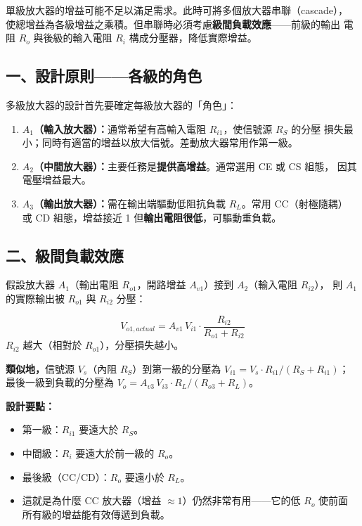\documentclass[12pt]{article}
\begin{document}

\begin{keybox}[為什麼需要多級放大器？]
單級放大器的增益可能不足以滿足需求。此時可將多個放大器串聯（cascade），
使總增益為各級增益之乘積。但串聯時必須考慮\textbf{級間負載效應}——前級的輸出
電阻 $R_o$ 與後級的輸入電阻 $R_i$ 構成分壓器，降低實際增益。
\end{keybox}

\subsection*{一、設計原則——各級的角色}

多級放大器的設計首先要確定每級放大器的「角色」：

\begin{enumerate}[leftmargin=2em,itemsep=3pt]
  \item \textbf{$A_1$（輸入放大器）：}通常希望有高輸入電阻 $R_{i1}$，使信號源 $R_S$ 的分壓
        損失最小；同時有適當的增益以放大信號。差動放大器常用作第一級。
  \item \textbf{$A_2$（中間放大器）：}主要任務是\textbf{提供高增益}。通常選用 CE 或 CS 組態，
        因其電壓增益最大。
  \item \textbf{$A_3$（輸出放大器）：}需在輸出端驅動低阻抗負載 $R_L$。常用 CC（射極隨耦）
        或 CD 組態，增益接近 1 但\textbf{輸出電阻很低}，可驅動重負載。
\end{enumerate}

\subsection*{二、級間負載效應}

\begin{keybox}
假設放大器 $A_1$（輸出電阻 $R_{o1}$，開路增益 $A_{v1}$）接到 $A_2$（輸入電阻 $R_{i2}$），
則 $A_1$ 的實際輸出被 $R_{o1}$ 與 $R_{i2}$ 分壓：
\begin{formulabox}
\[
  V_{o1,actual} = A_{v1}\,V_{i1} \cdot \frac{R_{i2}}{R_{o1} + R_{i2}}
\]
$R_{i2}$ 越大（相對於 $R_{o1}$），分壓損失越小。
\end{formulabox}

\textbf{類似地，}信號源 $V_s$（內阻 $R_S$）到第一級的分壓為
$V_{i1} = V_s \cdot R_{i1}/(R_S + R_{i1})$；
最後一級到負載的分壓為 $V_o = A_{v3}\,V_{i3} \cdot R_L/(R_{o3} + R_L)$。
\end{keybox}

\noindent\textbf{設計要點：}
\begin{itemize}[leftmargin=2em,itemsep=2pt]
  \item 第一級：$R_{i1}$ 要遠大於 $R_S$。
  \item 中間級：$R_i$ 要遠大於前一級的 $R_o$。
  \item 最後級（CC/CD）：$R_o$ 要遠小於 $R_L$。
  \item 這就是為什麼 CC 放大器（增益 $\approx 1$）仍然非常有用——它的低 $R_o$ 使前面
        所有級的增益能有效傳遞到負載。
\end{itemize}
\end{document}
